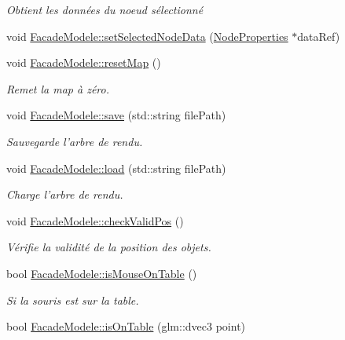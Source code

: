 \begin{DoxyCompactItemize}
\begin{DoxyCompactList}\small\item\em Obtient les données du noeud sélectionné \end{DoxyCompactList}\item 
void \hyperlink{group__inf2990_gae40b907a6c30f55176cde6b1736eaf72}{Facade\-Modele\-::set\-Selected\-Node\-Data} (\hyperlink{struct_node_properties}{Node\-Properties} $\ast$data\-Ref)
\item 
void \hyperlink{group__inf2990_gace5ff9435d6bcf501298d401207733bf}{Facade\-Modele\-::reset\-Map} ()
\begin{DoxyCompactList}\small\item\em Remet la map à zéro. \end{DoxyCompactList}\item 
void \hyperlink{group__inf2990_ga32032b986fdb830fb158dbd354aa55e7}{Facade\-Modele\-::save} (std\-::string file\-Path)
\begin{DoxyCompactList}\small\item\em Sauvegarde l'arbre de rendu. \end{DoxyCompactList}\item 
void \hyperlink{group__inf2990_ga4a34752db2d5c26cf97baca584c27dec}{Facade\-Modele\-::load} (std\-::string file\-Path)
\begin{DoxyCompactList}\small\item\em Charge l'arbre de rendu. \end{DoxyCompactList}\item 
void \hyperlink{group__inf2990_ga612cbe4c05f2e8adfb632db4fb1a3cf0}{Facade\-Modele\-::check\-Valid\-Pos} ()
\begin{DoxyCompactList}\small\item\em Vérifie la validité de la position des objets. \end{DoxyCompactList}\item 
bool \hyperlink{group__inf2990_gaaaa7ff115548c42faa0570a3c7c4648e}{Facade\-Modele\-::is\-Mouse\-On\-Table} ()
\begin{DoxyCompactList}\small\item\em Si la souris est sur la table. \end{DoxyCompactList}\item 
\hypertarget{group__inf2990_ga58f9c6d2f80118bcdf95e1967a455bea}{bool \hyperlink{group__inf2990_ga58f9c6d2f80118bcdf95e1967a455bea}{Facade\-Modele\-::is\-On\-Table} (glm\-::dvec3 point)}\label{group__inf2990_ga58f9c6d2f80118bcdf95e1967a455bea}


\end{DoxyCompactItemize}
